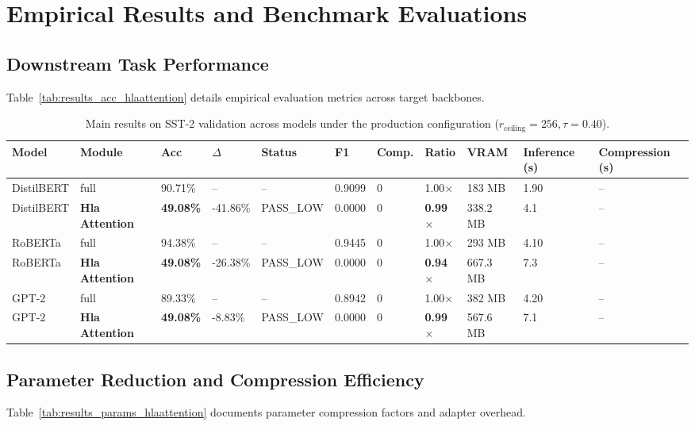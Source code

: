 \section{Empirical Results and Benchmark Evaluations}

\subsection{Downstream Task Performance}
Table~\ref{tab:results_acc_hlaattention} details empirical evaluation metrics across target backbones.

\begin{table}[t]
\centering
\small
\begin{tabular}{lllllllllll}
\toprule
\textbf{Model} & \textbf{Module} & \textbf{Acc} & \textbf{$\Delta$} & \textbf{Status} & \textbf{F1} & \textbf{Comp.} & \textbf{Ratio} & \textbf{VRAM} & \textbf{Inference (s)} & \textbf{Compression (s)} \\
\midrule
DistilBERT & full & 90.71\% & -- & -- & 0.9099 & 0 & 1.00$\times$ & 183 MB & 1.90 & -- \\
DistilBERT & \textbf{Hla Attention} & \textbf{49.08\%} & -41.86\% & PASS\_LOW & 0.0000 & 0 & \textbf{0.99$\times$} & 338.2 MB & 4.1 & -- \\
RoBERTa & full & 94.38\% & -- & -- & 0.9445 & 0 & 1.00$\times$ & 293 MB & 4.10 & -- \\
RoBERTa & \textbf{Hla Attention} & \textbf{49.08\%} & -26.38\% & PASS\_LOW & 0.0000 & 0 & \textbf{0.94$\times$} & 667.3 MB & 7.3 & -- \\
GPT-2 & full & 89.33\% & -- & -- & 0.8942 & 0 & 1.00$\times$ & 382 MB & 4.20 & -- \\
GPT-2 & \textbf{Hla Attention} & \textbf{49.08\%} & -8.83\% & PASS\_LOW & 0.0000 & 0 & \textbf{0.99$\times$} & 567.6 MB & 7.1 & -- \\
\bottomrule
\end{tabular}
\caption{Main results on SST-2 validation across models under the production configuration ($r_{\mathrm{ceiling}}=256, \tau=0.40$).}
\label{tab:main_sst2}
\end{table}

\subsection{Parameter Reduction and Compression Efficiency}
Table~\ref{tab:results_params_hlaattention} documents parameter compression factors and adapter overhead.

